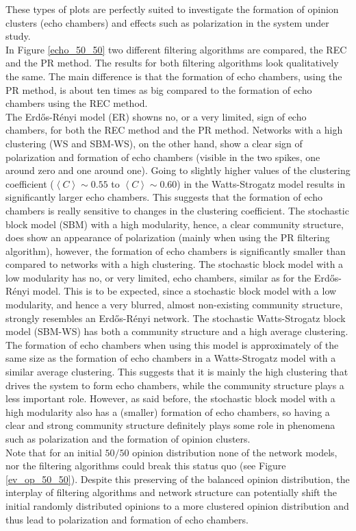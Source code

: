 \documentclass[11 pt , letterpaper , twoside , openright]{book}
\begin{document}
These types of plots are perfectly suited to investigate the formation of opinion clusters (echo chambers) and effects such as polarization in the system under study.\\
In Figure \ref{echo_50_50} two different filtering algorithms are compared, the REC and the PR method. The results for both filtering algorithms look qualitatively the same. The main difference is that the formation of echo chambers, using the PR method, is about ten times as big compared to the formation of echo chambers using the REC method. \\
The Erd\H{o}s-R\'{e}nyi model (ER) showns no, or a very limited, sign of echo chambers, for both the REC method and the PR method. Networks with a high clustering (WS and SBM-WS), on the other hand, show a clear sign of polarization and formation of echo chambers (visible in the two spikes, one around zero and one around one). Going to slightly higher values of the clustering coefficient ($\left<C\right> \sim 0.55$ to $\left<C\right> \sim 0.60$) in the Watts-Strogatz model results in significantly larger echo chambers. This suggests that the formation of echo chambers is really sensitive to changes in the clustering coefficient. The stochastic block model (SBM) with a high modularity, hence, a clear community structure, does show an appearance of polarization (mainly when using the PR filtering algorithm), however, the formation of echo chambers is significantly smaller than compared to networks with a high clustering. The stochastic block model with a low modularity has no, or very limited, echo chambers, similar as for the Erd\H{o}s-R\'{e}nyi   
model. This is to be expected, since a stochastic block model with a low modularity, and hence a very blurred, almost non-existing community structure, strongly resembles an Erd\H{o}s-R\'{e}nyi network. The stochastic Watts-Strogatz block model (SBM-WS) has both a community structure and a high average clustering. The formation of echo chambers when using this model is approximately of the same size as the formation of echo chambers in a Watts-Strogatz model with a similar average clustering. This suggests that it is mainly the high clustering that drives the system to form echo chambers, while the community structure plays a less important role. However, as said before, the stochastic block model with a high modularity also has a (smaller) formation of echo chambers, so having a clear and strong community structure definitely plays some role in phenomena such as polarization and the formation of opinion clusters. \\
Note that for an initial $50/50$ opinion distribution none of the network models, nor the filtering algorithms could break this status quo (see Figure \ref{ev_op_50_50}). Despite this preserving of the balanced opinion distribution, the interplay of filtering algorithms and network structure can potentially shift the initial randomly distributed opinions to a more clustered opinion distribution and thus lead to polarization and formation of echo chambers.
\end{document}
